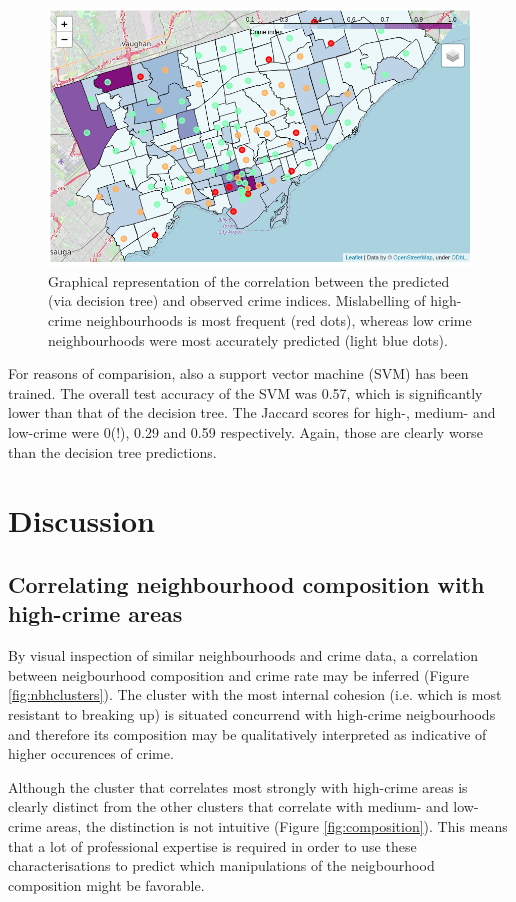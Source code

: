 \documentclass{article}
\begin{document}
\begin{figure}[ht]
\centering
 \includegraphics[width=\textwidth]{pics/prediction.png}
 \caption{Graphical representation of the correlation between the predicted (via decision tree) and observed crime indices. Mislabelling of high-crime neighbourhoods is most frequent (red dots), whereas low crime neighbourhoods were most accurately predicted (light blue dots).}\label{fig:predicted}
\end{figure} 

For reasons of comparision, also a support vector machine (SVM) has been trained. The overall test accuracy of the SVM was 0.57, which is significantly lower than that of the decision tree. The Jaccard scores for high-, medium- and low-crime were 0(!), 0.29 and 0.59 respectively. Again, those are clearly worse than the decision tree predictions.

\section{Discussion}
\subsection{Correlating neighbourhood composition with high-crime areas}
By visual inspection of similar neighbourhoods and crime data, a correlation between neigbourhood composition and crime rate may be inferred (Figure \ref{fig:nbhclusters}). The cluster with the most internal cohesion (i.e. which is most resistant to breaking up) is situated concurrend with high-crime neigbourhoods and therefore its composition may be qualitatively interpreted as indicative of higher occurences of crime.

Although the cluster that correlates most strongly with high-crime areas is clearly distinct from the other clusters that correlate with medium- and low-crime areas, the distinction is not intuitive (Figure \ref{fig:composition}). This means that a lot of professional expertise is required in order to use these characterisations to predict which manipulations of the neigbourhood composition might be favorable.  
\end{document}
